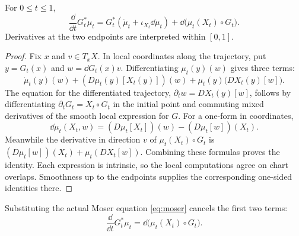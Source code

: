 \begin{lemma}\label{lem:cartan}
For $0\le t\le1$,
\[
 \frac{\dd}{\dd t}G_t^*\mu_t
 =G_t^*(\dot\mu_t+\iota_{X_t}\dd\mu_t)
   +\dd\bigl(\mu_t(X_t)\circ G_t\bigr).
\]
Derivatives at the two endpoints are interpreted within $[0,1]$.
\end{lemma}
\begin{proof}
Fix $x$ and $v\in T_xX$. In local coordinates along the
trajectory, put $y=G_t(x)$ and $w=\dd G_t(x)v$.
Differentiating $\mu_t(y)(w)$ gives three terms:
\[
 \dot\mu_t(y)(w)
 +(D\mu_t(y)[X_t(y)])(w)
 +\mu_t(y)\bigl(DX_t(y)[w]\bigr).
\]
The equation for the differentiated trajectory,
$\partial_t w=DX_t(y)[w]$, follows by differentiating
$\partial_tG_t=X_t\circ G_t$ in the initial point and commuting
mixed derivatives of the smooth local expression for $G$.
For a one-form in coordinates,
\[
 \dd\mu_t(X_t,w)
 =(D\mu_t[X_t])(w)-(D\mu_t[w])(X_t).
\]
Meanwhile the derivative in direction $v$ of
$\mu_t(X_t)\circ G_t$ is
$(D\mu_t[w])(X_t)+\mu_t(DX_t[w])$.
Combining these formulas proves the identity.
Each expression is intrinsic, so the local computations agree
on chart overlaps. Smoothness up to the endpoints supplies the
corresponding one-sided identities there.
\end{proof}

Substituting the actual Moser equation \eqref{eq:moser} cancels
the first two terms:
\begin{equation}\label{eq:derivativeexact}
 \frac{\dd}{\dd t}G_t^*\mu_t
 =\dd\bigl(\mu_t(X_t)\circ G_t\bigr).
\end{equation}

